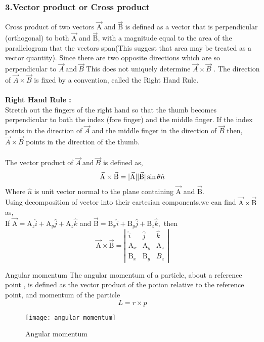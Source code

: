 \subsubsection{{\large 3}.Vector  product or Cross product}
Cross product of two vectors $\vec{\mathrm A}$ and $\vec{\mathrm B}$  is defined as a vector that is perpendicular (orthogonal) to both $\vec{\mathrm A}$ and $\vec{\mathrm B}$, with  a magnitude equal to the area of the parallelogram that the vectors span(This suggest that area may be treated as a vector quantity). Since there are two opposite directions which are so perpendicular to $\vec{A} \ \text{and} \ \vec{B}$  This does not uniquely determine $\vec{A} \times \vec{B}$ . The direction of $\vec{A} \times \vec{B}$ is fixed by a convention, called the Right Hand Rule.\\\\
\textbf{Right Hand Rule :}\\
Stretch out the fingers of the right hand so that the thumb becomes perpendicular to both the index (fore
finger) and the middle finger. If the index points in the direction of $\vec{A}$ and the middle finger in the direction of
$\vec{B}$ then, $\vec{A} \times \vec{B}$ points in the direction of the thumb.\\\\
The vector product of $\vec{A} \ \text{and} \ \vec{B}$  is defined as, 
\begin{equation}
$$\vec{\mathrm A} \times \vec{\mathrm B}=|\vec{\mathrm A}||\vec{\mathrm B}| \sin \theta  \hat{n}$$
\end{equation}
Where $\hat{n}$ is unit vector normal to the plane containing $\vec{\mathrm A}$ and $\vec{\mathrm B}$.
\\Using decomposition of vector into their cartesian components,we can find $\vec{\mathrm A} \times \vec{\mathrm B}$ as,
\\ If $\vec{\mathrm A}=\mathrm A_{z} \hat{i}+\mathrm A_{y} \hat{j}+\mathrm A_{z} \hat{k}$ and $\vec{\mathrm B}=\mathrm B_{x} \hat{i}+\mathrm B_{y} \hat{j}+\mathrm B_{z} \hat{k},$ then $$\vec{\mathrm A} \times \vec{\mathrm B}=\left|\begin{array}{lll}\hat{i} & \hat{j} & \hat{k} \\ \mathrm A_{x} & \mathrm A_{y} & \mathrm A_{z} \\ \mathrm B_{x} & \mathrm B_{y} & B_{z}\end{array}\right|$$
\begin{example}
	Angular momentum
	\newline The angular momentum of a particle, about a reference point , is defined as the vector product of the potion relative to the reference point, and momentum of the particle
	 $$ L=r\times p$$
	 \begin{figure}[H]
	 	\begin{center}
	 		\texttt{[image: angular momentum]}
	 	\end{center}
 	\caption{Angular momentum}
	 \end{figure}
\end{example}
